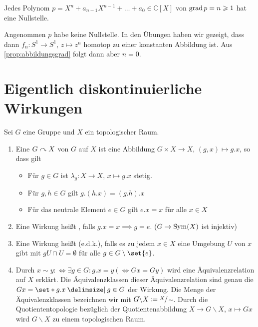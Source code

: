 \begin{satz}[{name={Hauptsatz der Algebra}},label=satz:hauptsatz-algebra]
	Jedes Polynom $p = X^n + a_{n-1} X^{n-1} + \ldots  + a_0 \in \mathbb{C}[X]$ von $\operatorname{grad} p = n \geqslant 1$ hat eine Nullstelle.
\end{satz}
\begin{beweis}
	Angenommen $p$ habe keine Nullstelle.
	In den Übungen haben wir gezeigt, dass dann $f_n \colon S^1 \to S^1$, $z \mapsto z^n$ homotop zu einer konstanten Abbildung ist. 
	Aus \cref{prop:abbildungsgrad} folgt dann aber $n=0$.
\end{beweis}

\newpage
\section{Eigentlich diskontinuierliche Wirkungen} %
\label{sec:eigentlich_diskontinuierliche_wirkungen}

\begin{definition}[{name=[Eigentlich diskontinuierliche Wirkung]}]
	Sei $G$ eine Gruppe und $X$ ein topologischer Raum.
	\begin{enumerate}[(1)]
		\item Eine  $G \mathrel{\curvearrowright} X$ von $G$ auf $X$ ist eine Abbildung $G \times X \to X$, $(g,x) \mapsto g . x$, so dass gilt
		\begin{itemize}
			\item Für $g \in G$ ist $\lambda_g \colon X \to X$, $x \mapsto g . x$ stetig.
			\item Für $g,h \in G$ gilt $g . (h . x)= (g . h) . x$
			\item Für das neutrale Element $e \in G$ gilt $e . x = x$ für alle $x \in X$
		\end{itemize}
		\item Eine Wirkung heißt , falls $g . x = x \implies g = e$. \hfill {\color{gray} ($G \to \operatorname{Sym}(X)$ ist injektiv)}
		\item Eine Wirkung heißt  (e.d.k.), falls es zu jedem $x \in X$ eine Umgebung $U$ von $x$ gibt mit $g U\cap U = \emptyset$ für alle $g \in G \setminus \set{e}$.
		\item Durch $x \sim y :\Leftrightarrow \exists g \in G : g . x = y (\Leftrightarrow G x = G y)$ wird eine 
		Äquivalenzrelation auf $X$ erklärt. 
		Die Äquivalenzklassen dieser Äquivalenzrelation sind genau die  $Gx =\set*{g. x \given g \in G}$ der Wirkung.
		Die Menge der Äquivalenzklassen bezeichnen wir mit $G \backslash X \coloneqq \sfrac{X}{\sim}$. 
		Durch die Quotiententopologie bezüglich der Quotientenabbildung  $X \to G\backslash X$, $x \mapsto G x$ wird $G \backslash X$ zu einem topologischen Raum.
	\end{enumerate}
\end{definition}

